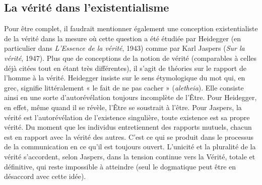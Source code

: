 \subsection{La vérité dans l’existentialisme}
Pour être complet, il faudrait mentionner
également une conception existentialiste
de la vérité dans la mesure où cette
question a été étudiée par Heidegger (en
particulier dans {\it L’Essence de la vérité},
1943) comme par Karl Jaspers ({\it Sur la
vérité}, 1947). Plus que de conceptions de
la notion de vérité (comparables à celles
déjà citées tout en étant très différentes),
il s’agit de théories sur le rapport de
l’homme à la vérité. Heidegger insiste sur
le sens étymologique du mot qui, en grec,
signifie littéralement « le fait de ne pas
cacher » ({\it aletheia}). Elle consiste ainsi en
une sorte d’autorévélation toujours
incomplète de l’Être. Pour Heidegger, en
effet, même quand il se révèle, l’Être se
soustrait à l’être. Pour Jaspers, la vérité
est l’autorévélation de l'existence singulière,
toute existence est sa propre vérité.
Du moment que les individus entretiennent
des rapports mutuels, chacun est en
rapport avec la vérité des autres. C’est ce
qui se produit dans le processus de la
communication en ce qu’il est toujours
ouvert. L’unicité et la pluralité de la vérité
s’accordent, selon Jaspers, dans la tension
continue vers la Vérité, totale et définitive,
qui reste impossible à atteindre (seul
le dogmatique peut être en désaccord
avec cette idée).

